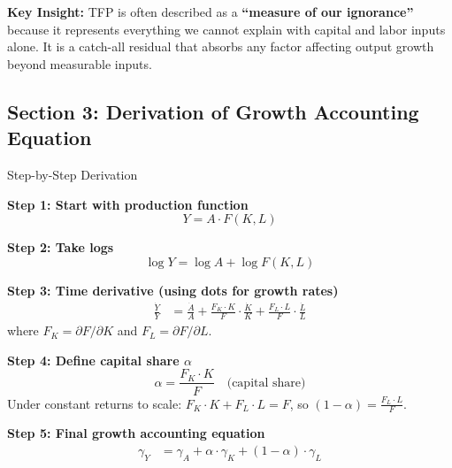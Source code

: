 \vspace{0.3cm}

\textbf{Key Insight:} TFP is often described as a \textbf{``measure of our ignorance''} because it represents everything we cannot explain with capital and labor inputs alone. It is a catch-all residual that absorbs any factor affecting output growth beyond measurable inputs.

\vspace{0.5cm}

\subsection*{Section 3: Derivation of Growth Accounting Equation}

\begin{derivationbox}{Step-by-Step Derivation}
    
    \textbf{Step 1: Start with production function}
    \begin{equation}
        Y = A \cdot F(K, L)
    \end{equation}
    
    \textbf{Step 2: Take logs}
    \begin{equation}
        \log Y = \log A + \log F(K, L)
    \end{equation}
    
    \textbf{Step 3: Time derivative (using dots for growth rates)}
    \begin{align}
        \frac{\dot{Y}}{Y} &= \frac{\dot{A}}{A} + \frac{F_K \cdot K}{F} \cdot \frac{\dot{K}}{K} + \frac{F_L \cdot L}{F} \cdot \frac{\dot{L}}{L} \tag{3.1}
    \end{align}
    where $F_K = \partial F / \partial K$ and $F_L = \partial F / \partial L$.
    
    \textbf{Step 4: Define capital share $\alpha$}
    \begin{equation}
        \alpha = \frac{F_K \cdot K}{F} \quad \text{(capital share)} \tag{3.2}
    \end{equation}
    Under constant returns to scale: $F_K \cdot K + F_L \cdot L = F$, so $(1-\alpha) = \frac{F_L \cdot L}{F}$.
    
    \textbf{Step 5: Final growth accounting equation}
    \begin{align}
        \gamma_Y &= \gamma_A + \alpha \cdot \gamma_K + (1-\alpha) \cdot \gamma_L \tag{3.3}
    \end{align}
    
\end{derivationbox}

